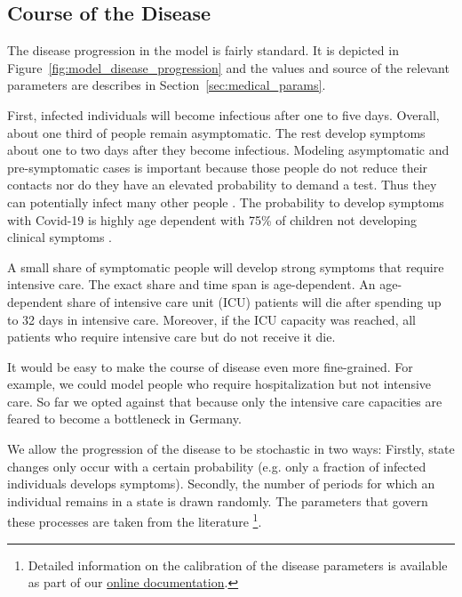 \subsection{Course of the Disease}
\label{sub:disease_progression}

The disease progression in the model is fairly standard. It is depicted in
Figure~\ref{fig:model_disease_progression} and the values and source of the relevant
parameters are describes in Section~\ref{sec:medical_params}.

First, infected individuals will become infectious after one to five days. Overall,
about one third of people remain asymptomatic. The rest develop symptoms about one to
two days after they become infectious. Modeling asymptomatic and pre-symptomatic cases
is important because those people do not reduce their contacts nor do they have an
elevated probability to demand a test. Thus they can potentially infect many other
people \citep{Donsimoni2020}. The probability to develop
symptoms with Covid-19 is highly age dependent with 75\% of children not developing
clinical symptoms \citep{Davies2020}.

A small share of symptomatic people will develop strong symptoms that require intensive
care. The exact share and time span is age-dependent. An age-dependent share of intensive
care unit (ICU) patients will die after spending up to 32 days in intensive care.
Moreover, if the ICU capacity was reached, all patients who require intensive care but do
not receive it die.

It would be easy to make the course of disease even more fine-grained. For example, we
could model people who require hospitalization but not intensive care. So far we opted
against that because only the intensive care capacities are feared to become a bottleneck
in Germany.

We allow the progression of the disease to be stochastic in two ways: Firstly, state
changes only occur with a certain probability (e.g. only a fraction of infected
individuals develops symptoms). Secondly, the number of periods for which an individual
remains in a state is drawn randomly. The parameters that govern these processes are
taken from the literature \footnote{ Detailed information on the calibration of the
disease parameters is available as part of our
\href{https://sid-dev.readthedocs.io/en/latest/reference_guides/epi_params.html}{online
documentation}.}.


